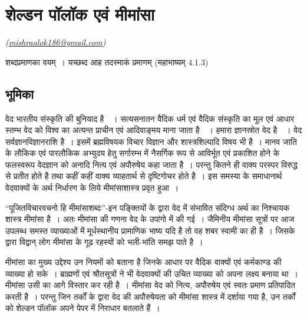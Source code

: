 \chapter{शेल्डन पॉलॉक एवं मीमांसा}\label{chapter3}


\vskip -7pt

\hfill{\sl(\url{mishraalok186@gmail.com})}

\bgroup

\selectdev

\bigskip

\centerline{शब्दप्रमाणका वयम्~। यच्छब्द आह तदस्माकं प्रमाणम् (महाभाष्यम् 4.1.3)}

\vspace{-.5cm}

\section*{भूमिका}

वेद भारतीय संस्कृति की बुनियाद है~~। सत्यसनातन वैदिक धर्म एवं वैदिक संस्कृति का मूल एवं आधार स्तम्भ वेद को विश्व का अत्यन्त प्राचीन एवं आदिवाङ्मय माना जाता है~~। हमारा ज्ञानस्रोत वेद है~~। वेद सर्वज्ञानविज्ञानराशि है~। इसमें ब्रह्मविषयक विचार विज्ञान और शास्त्रशिल्पादि विषय भी है~। मानव जाति के लौकिक एवं पारलौकिक अभ्युदय हेतु सर्गारम्भ में नैसर्गिक रूप से आविर्भूत एवं प्रकाशित होने के फलस्वरूप वेदज्ञान को अनादि नित्य एवं अपौरुषेय कहा जाता है~। परन्तु कितने ही वाक्य परस्पर विरुद्ध से प्रतीत होते है तथा कहीं कहीं वाक्य व्याहतार्थ से दृष्टिगोचर होते है~। इस समस्या के समाधानार्थ वेदवाक्यों के अर्थ निर्धारण के लिये मीमांसाशास्त्र प्रवृत हुआ~।

“पूजितविचारवचनो हि मीमांसाशब्दः”-इन पङ्क्तियों के द्वारा वेद में संभावित संदिग्ध अर्थ का निश्चायक शास्त्र मीमांसा है~। अतः मीमांसा की गणना वेद के उपांगो में की गई~। जैमिनीय मीमांसा सूत्रों पर आज उपलब्ध समस्त व्याख्याओं में मूर्धस्थानीय प्रामाणिक भाष्य यदि है तो वह शबर स्वामी का ही है~। जिसके द्वारा विद्वान् लोग मीमांसा के गूढ रहस्यों को भली-भांति समझ पाते है~। 

मीमांसा का मुख्य उद्देश्य उन नियमों को बताना है जिनके आधार पर वैदिक वाक्यों एवं कर्मकाण्ड की व्याख्या हो सके~। ब्राह्मणों एवं श्रौतसूत्रों ने भी वेदवाक्यों की उचित व्याख्या को अपना लक्ष्य बनाया था~। मीमांसा उसी का आगे विस्तार कर रही है~। मीमांसा वेद को नित्य, अपौरुषेय एवं स्वतः प्रमाण प्रतिपादित करती है~। परन्तु जिन तर्कों के द्वारा वेद की अपौरुषेयता को मीमांसा शास्त्र में दर्शाया गया है, उन तर्कों को शेल्डन पॉलॉक अपने पेपर  में निराधार बतलाते हैं~।

